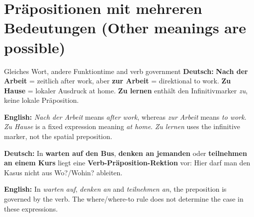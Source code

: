 \documentclass[a4paper,11pt]{article}
\newcommand{\GermanText}[1]{\textbf{Deutsch: }#1\par}
\newcommand{\EnglishText}[1]{{\small\color{SoftGray}\textbf{English: }#1\par}}
\begin{document}
\section{Präpositionen mit mehreren Bedeutungen (Other meanings are possible)}
\begin{grammarentry}{Gleiches Wort, andere Funktion}{time and verb government}
\GermanText{\textbf{Nach der Arbeit} = zeitlich \glqq after work\grqq{}, aber \textbf{zur Arbeit} = direktional \glqq to work\grqq{}. \textbf{Zu Hause} = lokaler Ausdruck \glqq at home\grqq{}. \textbf{Zu lernen} enthält den Infinitivmarker \emph{zu}, keine lokale Präposition.}
\EnglishText{\emph{Nach der Arbeit} means \emph{after work}, whereas \emph{zur Arbeit} means \emph{to work}. \emph{Zu Hause} is a fixed expression meaning \emph{at home}. \emph{Zu lernen} uses the infinitive marker, not the spatial preposition.}
\GermanText{In \textbf{warten auf den Bus}, \textbf{denken an jemanden} oder \textbf{teilnehmen an einem Kurs} liegt eine \textbf{Verb-Präposition-Rektion} vor: Hier darf man den Kasus nicht aus \glqq Wo?/Wohin?\grqq{} ableiten.}
\EnglishText{In \emph{warten auf}, \emph{denken an} and \emph{teilnehmen an}, the preposition is governed by the verb. The where/where-to rule does not determine the case in these expressions.}
\end{grammarentry}
\end{document}
